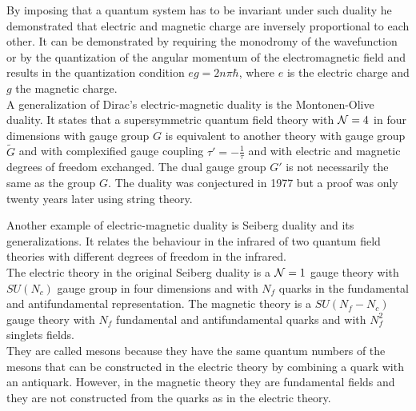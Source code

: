 By imposing that a quantum system has to be invariant under such duality he demonstrated that electric and magnetic charge are inversely proportional to each other. 
It can be demonstrated by requiring the monodromy of the wavefunction or by the quantization of the angular momentum of the electromagnetic field and results in the quantization condition $e g =  2 n \pi \hbar$, where $e$ is the electric charge and $g$ the magnetic charge.\\
A generalization of Dirac's electric-magnetic duality is the Montonen-Olive duality.
It states that a supersymmetric quantum field theory with $\mathcal{N}=4$ in four dimensions with gauge group $G$ is equivalent to another theory with gauge group $\tilde{G}$ and with complexified gauge coupling $\tau' = - \frac{1}{\tau}$ and with electric and magnetic degrees of freedom exchanged.
The dual gauge group $G'$ is not necessarily the same as the group $G$.
The duality was conjectured in 1977 but a proof was only twenty years later using string theory.






Another example of electric-magnetic duality is Seiberg duality and its generalizations.
It relates the behaviour in the infrared of two quantum field theories with different degrees of freedom in the infrared.\\
The electric theory in the original Seiberg duality is a $\mathcal{N}=1$ gauge theory with $SU(N_c)$ gauge group in four dimensions and with $N_f$ quarks in the fundamental and antifundamental representation.
The magnetic theory is a $SU(N_f-N_c)$ gauge theory with $N_f$ fundamental and antifundamental quarks and with $N_f^2$ singlets fields. \\
They are called mesons because they have the same quantum numbers of the mesons that can be constructed in the electric theory by combining a quark with an antiquark. 
However, in the magnetic theory they are fundamental fields and they are not constructed from the quarks as in the electric theory.\\






